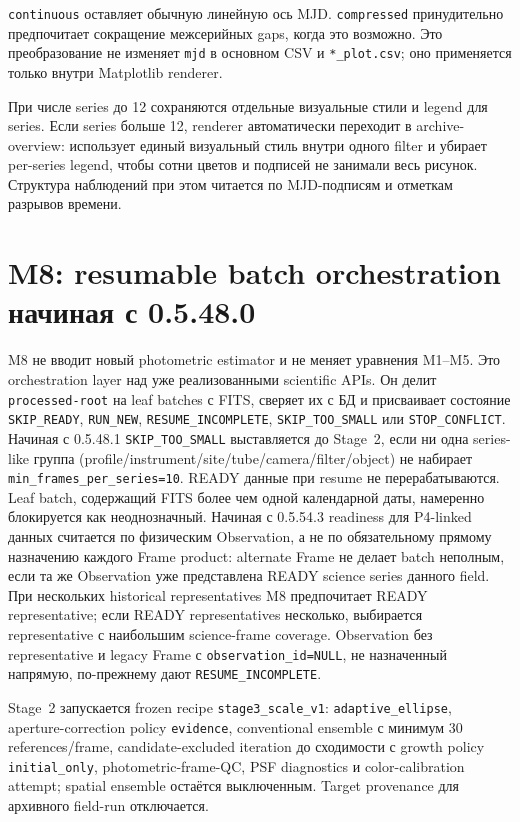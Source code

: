 \texttt{continuous} оставляет обычную линейную ось MJD. \texttt{compressed} принудительно предпочитает сокращение межсерийных gaps, когда это возможно. Это преобразование не изменяет \texttt{mjd} в основном CSV и \texttt{*\_plot.csv}; оно применяется только внутри Matplotlib renderer.

При числе series до 12 сохраняются отдельные визуальные стили и legend для series. Если series больше 12, renderer автоматически переходит в archive-overview: использует единый визуальный стиль внутри одного filter и убирает per-series legend, чтобы сотни цветов и подписей не занимали весь рисунок. Структура наблюдений при этом читается по MJD-подписям и отметкам разрывов времени.

\section{M8: resumable batch orchestration начиная с 0.5.48.0}

M8 не вводит новый photometric estimator и не меняет уравнения M1--M5. Это orchestration layer над уже реализованными scientific APIs. Он делит \texttt{processed-root} на leaf batches с FITS, сверяет их с БД и присваивает состояние \texttt{SKIP\_READY}, \texttt{RUN\_NEW}, \texttt{RESUME\_INCOMPLETE}, \texttt{SKIP\_TOO\_SMALL} или \texttt{STOP\_CONFLICT}. Начиная с 0.5.48.1 \texttt{SKIP\_TOO\_SMALL} выставляется до Stage~2, если ни одна series-like группа (profile/instrument/site/tube/camera/filter/object) не набирает \texttt{min\_frames\_per\_series=10}. READY данные при resume не перерабатываются. Leaf batch, содержащий FITS более чем одной календарной даты, намеренно блокируется как неоднозначный. Начиная с 0.5.54.3 readiness для P4-linked данных считается по физическим Observation, а не по обязательному прямому назначению каждого Frame product: alternate Frame не делает batch неполным, если та же Observation уже представлена READY science series данного field. При нескольких historical representatives M8 предпочитает READY representative; если READY representatives несколько, выбирается representative с наибольшим science-frame coverage. Observation без representative и legacy Frame с \texttt{observation\_id=NULL}, не назначенный напрямую, по-прежнему дают \texttt{RESUME\_INCOMPLETE}.

Stage~2 запускается frozen recipe \texttt{stage3\_scale\_v1}: \texttt{adaptive\_ellipse}, aperture-correction policy \texttt{evidence}, conventional ensemble с минимум 30 references/frame, candidate-excluded iteration до сходимости с growth policy \texttt{initial\_only}, photometric-frame-QC, PSF diagnostics и color-calibration attempt; spatial ensemble остаётся выключенным. Target provenance для архивного field-run отключается.

